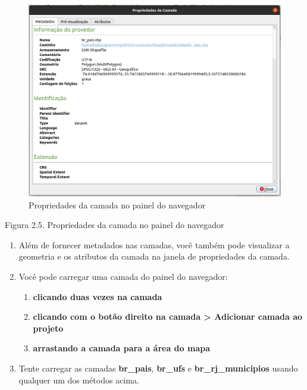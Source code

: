 \documentclass[
  portuguese,
]{krantz}
\providecommand{\tightlist}{%
  \setlength{\itemsep}{0pt}\setlength{\parskip}{0pt}}
\begin{document}
\begin{figure}
\centering
\includegraphics{media/modulo2/qgis-browser-layer-properties.png}
\caption{Propriedades da camada no painel do navegador}
\end{figure}

Figura 2.5. Propriedades da camada no painel do navegador

\begin{enumerate}
\def\labelenumi{\arabic{enumi}.}
\setcounter{enumi}{7}
\item
  Além de fornecer metadados nas camadas, você também pode visualizar a geometria e os atributos da camada na janela de propriedades da camada.
\item
  Você pode carregar uma camada do painel do navegador:

  \begin{enumerate}
  \def\labelenumii{\arabic{enumii}.}
  \tightlist
  \item
    \textbf{clicando duas vezes na camada}
  \item
    \textbf{clicando com o botão direito na camada \textgreater{} Adicionar camada ao projeto}
  \item
    \textbf{arrastando a camada para a área do mapa}
  \end{enumerate}
\item
  Tente carregar as camadas \textbf{br\_pais}, \textbf{br\_ufs} e \textbf{br\_rj\_municipios} usando qualquer um dos métodos acima.
\end{enumerate}
\end{document}
